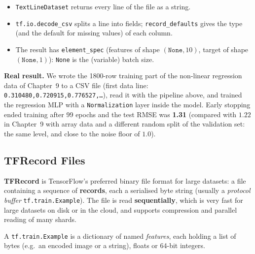 \begin{itemize}
  \item \texttt{TextLineDataset} returns every line of the file as a string.
  \item \texttt{tf.io.decode\_csv} splits a line into fields; \texttt{record\_defaults} gives the type (and the default for missing values) of each column.
  \item The result has \texttt{element\_spec} (features of shape $(\texttt{None},10)$, target of shape $(\texttt{None},1)$): \texttt{None} is the (variable) batch size.
\end{itemize}

\textbf{Real result.} We wrote the 1800-row training part of the non-linear regression data of Chapter~9 to a CSV file (first data line: \texttt{0.310480,0.720915,0.776527,\dots}), read it with the pipeline above, and trained the regression MLP with a \texttt{Normalization} layer inside the model. Early stopping ended training after 99 epochs and the test RMSE was \textbf{1.31} (compared with $1.22$ in Chapter~9 with array data and a different random split of the validation set: the same level, and close to the noise floor of $1.0$).

\subsection{TFRecord Files}

\begin{definition}[: TFRecord]
\textbf{TFRecord} is TensorFlow's preferred binary file format for large datasets: a file containing a sequence of \textbf{records}, each a serialised byte string (usually a \emph{protocol buffer} \texttt{tf.train.Example}). The file is read \textbf{sequentially}, which is very fast for large datasets on disk or in the cloud, and supports compression and parallel reading of many shards.
\end{definition}

A \texttt{tf.train.Example} is a dictionary of named \emph{features}, each holding a list of bytes (e.g.\ an encoded image or a string), floats or 64-bit integers.

